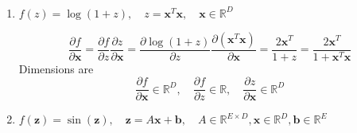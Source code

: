 \paragraph{}

\begin{enumerate}[label=\alph*.]
    \item $f(z) = \log(1 + z), \quad z = \textbf{x}^T\textbf{x}, \quad \textbf{x}\in\mathbb{R}^D$
    
\[
\frac{\partial f}{\partial \textbf{x}} = \frac{\partial f}{\partial z} \frac{\partial z}{\partial \textbf{x}} = \frac{\partial \log(1 + z)}{\partial z} \frac{\partial (\textbf{x}^T\textbf{x})}{\partial \textbf{x}} = \frac{2\textbf{x}^T}{1 + z} = \frac{2\textbf{x}^T}{1 + \textbf{x}^T\textbf{x}} 
\]
Dimensions are 
\[
\frac{\partial f}{\partial \textbf{x}} \in \mathbb{R}^D, \quad \frac{\partial f}{\partial z} \in \mathbb{R}, \quad \frac{\partial z}{\partial \textbf{x}} \in \mathbb{R}^D
\]
    
    \item $f(\textbf{z}) = \sin(\textbf{z}), \quad \textbf{z} = A\textbf{x} + \textbf{b}, \quad A\in\mathbb{R}^{E\times D}, \textbf{x}\in\mathbb{R}^D, \textbf{b}\in\mathbb{R}^E$


\end{enumerate}
